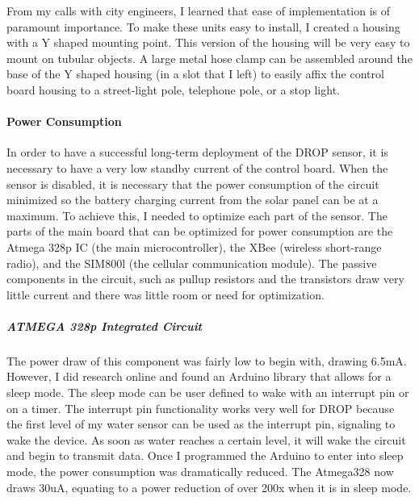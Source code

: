 \documentclass[letter]{article}
\begin{document}
From my calls with city engineers, I learned that ease of implementation is of paramount importance. To make these units easy to install, I created a housing with a Y shaped mounting point. This version of the housing will be very easy to mount on tubular objects. A large metal hose clamp can be assembled around the base of the Y shaped housing (in a slot that I left) to easily affix the control board housing to a street-light pole, telephone pole, or a stop light. 

\paragraph{Power Consumption} In order to have a successful long-term deployment of the DROP sensor, it is necessary to have a very low standby current of the control board. When the sensor is disabled, it is necessary that the power consumption of the circuit minimized so the battery charging current from the solar panel can be at a maximum. To achieve this, I needed to optimize each part of the sensor. The parts of the main board that can be optimized for power consumption are the Atmega 328p IC (the main microcontroller), the XBee (wireless short-range radio), and the SIM800l (the cellular communication module). The passive components in the circuit, such as pullup resistors and the transistors draw very little current and there was little room or need for optimization. 

\subparagraph{ATMEGA 328p Integrated Circuit} The power draw of this component was fairly low to begin with, drawing 6.5mA. However, I did research online and found an Arduino library that allows for a sleep mode. The sleep mode can be user defined to wake with an interrupt pin or on a timer. The interrupt pin functionality works very well for DROP because the first level of my water sensor can be used as the interrupt pin, signaling to wake the device. As soon as water reaches a certain level, it will wake the circuit and begin to transmit data. Once I programmed the Arduino to enter into sleep mode, the power consumption was dramatically reduced. The Atmega328 now draws 30uA, equating to a power reduction of over 200x when it is in sleep mode. 
\end{document}
